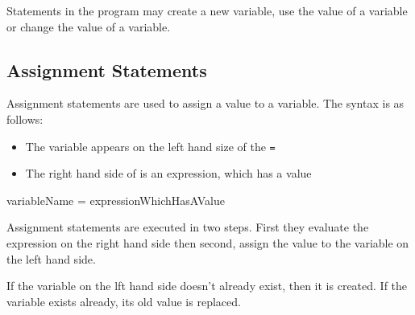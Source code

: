Statements in the program may create a new variable, use the value of a variable or change the value of a variable.

\subsection*{Assignment Statements}
Assignment statements are used to assign a value to a variable. The syntax is as follows:
\begin{itemize}
    \item The variable appears on the left hand size of the \verb|=|
    \item The right hand side of is an expression, which has a value
\end{itemize}
\begin{python}
variableName = expressionWhichHasAValue
\end{python}

Assignment statements are executed in two steps. First they evaluate the expression on the right hand side then second, assign the value to the variable on the left hand side.

If the variable on the lft hand side doesn't already exist, then it is created. If the variable exists already, its old value is replaced.


